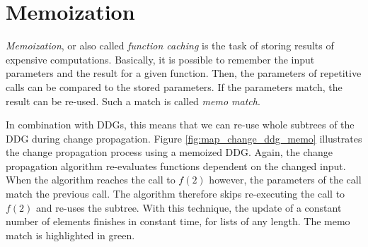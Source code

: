 \section{Memoization}

\textit{Memoization}, or also called \textit{function caching} is the task of storing results of expensive computations. Basically, it is possible to remember the input parameters and the result for a given function. Then, the parameters of repetitive calls can be compared to the stored parameters. If the parameters match, the result can be re-used. Such a match is called \textit{memo match}.

In combination with DDGs, this means that we can re-use whole subtrees of the DDG during change propagation. Figure \ref{fig:map_change_ddg_memo} illustrates the change propagation process using a memoized DDG. Again, the change propagation algorithm re-evaluates functions dependent on the changed input. When the algorithm reaches the call to $f(2)$ however, the parameters of the call match the previous call. The algorithm therefore skips re-executing the call to $f(2)$ and re-uses the subtree. With this technique, the update of a constant number of elements finishes in constant time, for lists of any length. 
The memo match is highlighted in green. 

